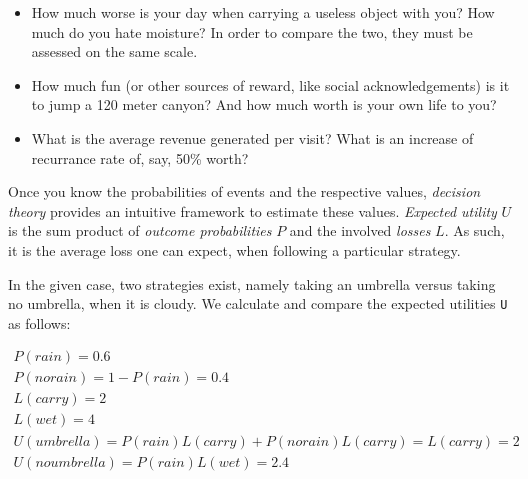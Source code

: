 \documentclass[]{svmono}
\providecommand{\tightlist}{%
  \setlength{\itemsep}{0pt}\setlength{\parskip}{0pt}}
\theoremstyle{definition}
\theoremstyle{definition}
\theoremstyle{definition}
\theoremstyle{remark}
\begin{document}
\begin{itemize}
\tightlist
\item
  How much worse is your day when carrying a useless object with you?
  How much do you hate moisture? In order to compare the two, they must
  be assessed on the same scale.
\item
  How much fun (or other sources of reward, like social
  acknowledgements) is it to jump a 120 meter canyon? And how much worth
  is your own life to you?
\item
  What is the average revenue generated per visit? What is an increase
  of recurrance rate of, say, 50\% worth?
\end{itemize}

Once you know the probabilities of events and the respective values,
\emph{decision theory} provides an intuitive framework to estimate these
values. \emph{Expected utility} \(U\) is the sum product of
\emph{outcome probabilities} \(P\) and the involved \emph{losses} \(L\).
As such, it is the average loss one can expect, when following a
particular strategy.

In the given case, two strategies exist, namely taking an umbrella
versus taking no umbrella, when it is cloudy. We calculate and compare
the expected utilities \texttt{U} as follows:

\[\begin{aligned}
P(rain) = 0.6 \\
P(no rain) = 1 - P(rain) = 0.4 \\
L(carry) = 2 \\
L(wet) = 4 \\
U(umbrella) = P(rain) L(carry) + P(no rain) L(carry)  = L(carry) = 2\\
U(no umbrella) = P(rain) L(wet) = 2.4
\end{aligned}
\]
\end{document}
